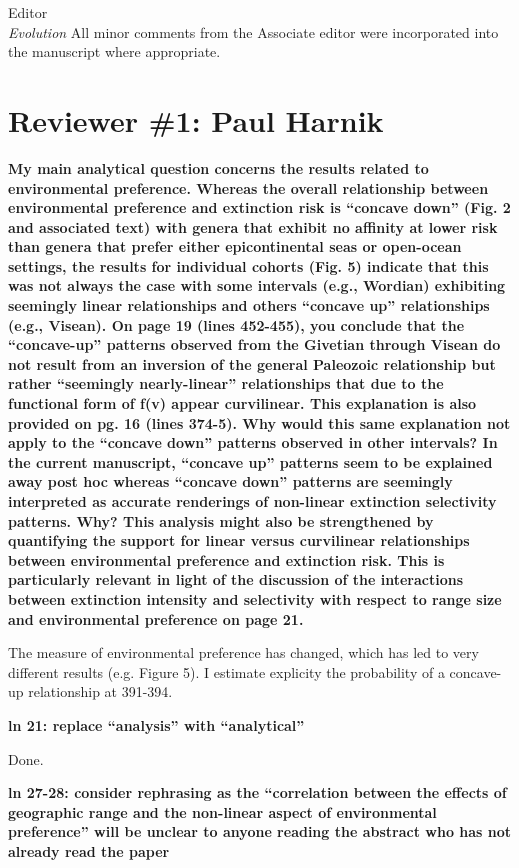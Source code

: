 \documentclass{letter}
\begin{document}
\begin{letter}{Editor \\ \textit{Evolution}}
  All minor comments from the Associate editor were incorporated into the manuscript where appropriate.
 
  \section{Reviewer \#1: Paul Harnik}
  \textbf{My main analytical question concerns the results related to environmental preference. Whereas the overall relationship between environmental preference and extinction risk is “concave down” (Fig. 2 and associated text) with genera that exhibit no affinity at lower risk than genera that prefer either epicontinental seas or open-ocean settings, the results for individual cohorts (Fig. 5) indicate that this was not always the case with some intervals (e.g., Wordian) exhibiting seemingly linear relationships and others “concave up” relationships (e.g., Visean). On page 19 (lines 452-455), you conclude that the “concave-up” patterns observed from the Givetian through Visean do not result from an inversion of the general Paleozoic relationship but rather “seemingly nearly-linear” relationships that due to the functional form of f(v) appear curvilinear. This explanation is also provided on pg. 16 (lines 374-5). Why would this same explanation not apply to the “concave down” patterns observed in other intervals? In the current manuscript, “concave up” patterns seem to be explained away post hoc whereas “concave down” patterns are seemingly interpreted as accurate renderings of non-linear extinction selectivity patterns. Why? This analysis might also be strengthened by quantifying the support for linear versus curvilinear relationships between environmental preference and extinction risk. This is particularly relevant in light of the discussion of the interactions between extinction intensity and selectivity with respect to range size and environmental preference on page 21.}

  The measure of environmental preference has changed, which has led to very different results (e.g. Figure 5). I estimate explicity the probability of a concave-up relationship at 391-394.

  \textbf{ln 21: replace “analysis” with “analytical”}

  Done.

  \textbf{ln 27-28: consider rephrasing as the “correlation between the effects of geographic range and the non-linear aspect of environmental preference” will be unclear to anyone reading the abstract who has not already read the paper}


\end{letter}
\end{document}
